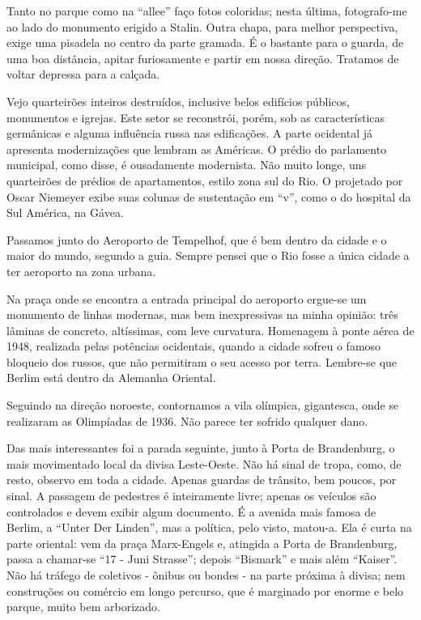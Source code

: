 Tanto no parque como na “allee” faço fotos coloridas; nesta última, fotografo-me ao lado do monumento erigido a Stalin. Outra chapa, para melhor perspectiva, exige uma pisadela no centro da parte gramada. É o bastante para o guarda, de uma boa distância, apitar furiosamente e partir em nossa direção. Tratamos de voltar depressa para a calçada.

Vejo quarteirões inteiros destruídos, inclusive belos edifícios públicos, monumentos e igrejas. Este setor se reconstrói, porém, sob as características germânicas e alguma influência russa nas edificações. A parte ocidental já apresenta modernizações que lembram as Américas. O prédio do parlamento municipal, como disse, é ousadamente modernista. Não muito longe, uns quarteirões de prédios de apartamentos, estilo zona sul do Rio. O projetado por Oscar Niemeyer exibe suas colunas de sustentação em “v”, como o do hospital da Sul América, na Gávea.

Passamos junto do Aeroporto de Tempelhof, que é bem dentro da cidade e o maior do mundo, segundo a guia. Sempre pensei que o Rio fosse a única cidade a ter aeroporto na zona urbana.

Na praça onde se encontra a entrada principal do aeroporto ergue-se um monumento de linhas modernas, mas bem inexpressivas na minha opinião: três lâminas de concreto, altíssimas, com leve curvatura. Homenagem à ponte aérea de 1948, realizada pelas potências ocidentais, quando a cidade sofreu o famoso bloqueio dos russos, que não permitiram o seu acesso por terra. Lembre-se que Berlim está dentro da Alemanha Oriental.

Seguindo na direção noroeste, contornamos a vila olímpica, gigantesca, onde se realizaram as Olimpíadas de 1936. Não parece ter sofrido qualquer dano.

Das mais interessantes foi a parada seguinte, junto à Porta de Brandenburg, o mais movimentado local da divisa Leste-Oeste. Não há sinal de tropa, como, de resto, observo em toda a cidade. Apenas guardas de trânsito, bem poucos, por sinal. A passagem de pedestres é inteiramente livre; apenas os veículos são controlados e devem exibir algum documento. É a avenida mais famosa de Berlim, a “Unter Der Linden”, mas a política, pelo visto, matou-a. Ela é curta na parte oriental: vem da praça Marx-Engels e, atingida a Porta de Brandenburg, passa a chamar-se “17 - Juni Strasse”; depois “Bismark” e mais além “Kaiser”. Não há tráfego de coletivos - ônibus ou bondes - na parte próxima à divisa; nem construções ou comércio em longo percurso, que é marginado por enorme e belo parque, muito bem arborizado.

